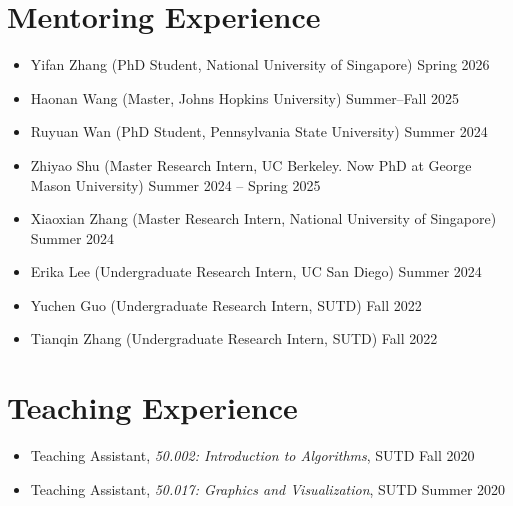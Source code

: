 \documentclass[11pt, letterpaper]{article}
\begin{document}
\section{Mentoring Experience}
\begin{itemize}[itemsep=4pt]
\item Yifan Zhang (PhD Student, National University of Singapore) \hfill Spring 2026
\item Haonan Wang (Master, Johns Hopkins University) \hfill Summer--Fall 2025
\item Ruyuan Wan (PhD Student, Pennsylvania State University) \hfill Summer 2024
\item Zhiyao Shu (Master Research Intern, UC Berkeley. Now PhD at George Mason University) \hfill Summer 2024 -- Spring 2025
\item Xiaoxian Zhang (Master Research Intern, National University of Singapore) \hfill Summer 2024
\item Erika Lee (Undergraduate Research Intern, UC San Diego) \hfill Summer 2024
\item Yuchen Guo (Undergraduate Research Intern, SUTD) \hfill Fall 2022
\item Tianqin Zhang (Undergraduate Research Intern, SUTD) \hfill Fall 2022
\end{itemize}

\section{Teaching Experience}
\begin{itemize}[itemsep=4pt]
\item Teaching Assistant, \textit{50.002: Introduction to Algorithms}, SUTD \hfill Fall 2020
\item Teaching Assistant, \textit{50.017: Graphics and Visualization}, SUTD \hfill Summer 2020
\end{itemize}
\end{document}
